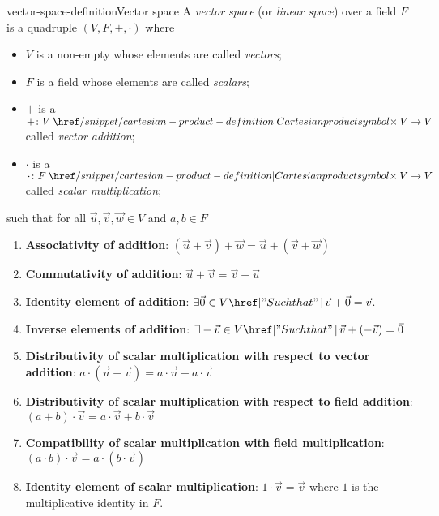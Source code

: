 \documentclass[preview]{standalone}
\begin{document}
\begin{snippetdefinition}{vector-space-definition}{Vector space}
    A \textit{vector space} (or \textit{linear space}) over a field \(F\) is a quadruple
    \((V, F, +, \cdot)\) where
    \begin{itemize}
        \item \(V\) is a non-empty \set whose elements are called \textit{vectors};
        \item \(F\) is a field whose elements are called \textit{scalars};
        \item \(+\) is a \binoperation \(+\colon V \cartesianprod V \to V\) called \textit{vector addition};
        \item \(\cdot\) is a \binoperation \(\cdot\colon F \cartesianprod V \to V\) called \textit{scalar multiplication};
    \end{itemize}
    such that for all \(\vec{u}, \vec{v}, \vec{w} \in V\) and \(a,b \in F\)
    \begin{enumerate}
        \item \textbf{Associativity of addition}: 
        \(
        (\vec{u} + \vec{v}) + \vec{w} = \vec{u} + (\vec{v} + \vec{w})
        \)
        
        \item \textbf{Commutativity of addition}: 
        \(
        \vec{u} + \vec{v} = \vec{v} + \vec{u}
        \)
        
        \item \textbf{Identity element of addition}: \( \exists \vec{0} \in V \suchthat
        \vec{v} + \vec{0} = \vec{v} \).
        
        \item \textbf{Inverse elements of addition}: \( \exists -\vec{v} \in V \suchthat 
        \vec{v} + (-\vec{v}) = \vec{0}\)
        
        \item \textbf{Distributivity of scalar multiplication with respect to vector addition}: 
        \(
        a \cdot (\vec{u} + \vec{v}) = a \cdot \vec{u} + a \cdot \vec{v}
        \)
        
        \item \textbf{Distributivity of scalar multiplication with respect to field addition}: 
        \(
        (a + b) \cdot \vec{v} = a \cdot \vec{v} + b \cdot \vec{v}
        \)
        
        \item \textbf{Compatibility of scalar multiplication with field multiplication}: 
        \(
        (a \cdot b) \cdot \vec{v} = a \cdot (b \cdot \vec{v})
        \)
        
        \item \textbf{Identity element of scalar multiplication}: 
        \(
        1 \cdot \vec{v} = \vec{v}
        \)
        where \( 1 \) is the multiplicative identity in \( F \).
    \end{enumerate}
\end{snippetdefinition}
\end{document}
